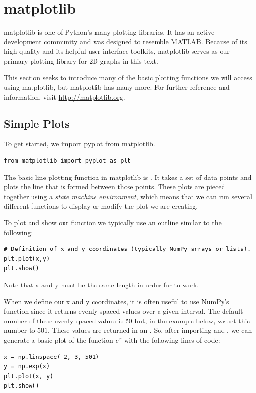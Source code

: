 \label{lab:Matplotlib_and_Mayavi}

\section*{matplotlib}
matplotlib is one of Python's many plotting libraries.
It has an active development community and was designed to resemble MATLAB.
Because of its high quality and its helpful user interface toolkits, matplotlib serves as our primary plotting library for 2D graphs in this text.

This section seeks to introduce many of the basic plotting functions we will access using matplotlib, but matplotlib has many more.
For further reference and information, visit \url{http://matplotlib.org}.


\subsection*{Simple Plots}
To get started, we import pyplot from matplotlib.
\begin{lstlisting}
from matplotlib import pyplot as plt
\end{lstlisting}

The basic line plotting function in matplotlib is .
It takes a set of data points and plots the line that is formed between those points.
These plots are pieced together using a \emph{state machine environment}, which means that we can run several different functions to display or modify the plot we are creating.

To plot and show our function we typically use an outline similar to the following:
\begin{lstlisting}
# Definition of x and y coordinates (typically NumPy arrays or lists).
plt.plot(x,y)
plt.show()
\end{lstlisting}
Note that x and y must be the same length in order for  to work.

When we define our x and y coordinates, it is often useful to use NumPy's  function since it returns evenly spaced values over a given interval.
The default number of these evenly spaced values is $50$ but, in the example below, we set this number to $501$.
These values are returned in an .
So, after importing  and , we can generate a basic plot of the function $e^x$ with the following lines of code:
\begin{lstlisting}
x = np.linspace(-2, 3, 501)
y = np.exp(x)
plt.plot(x, y)
plt.show()
\end{lstlisting}


